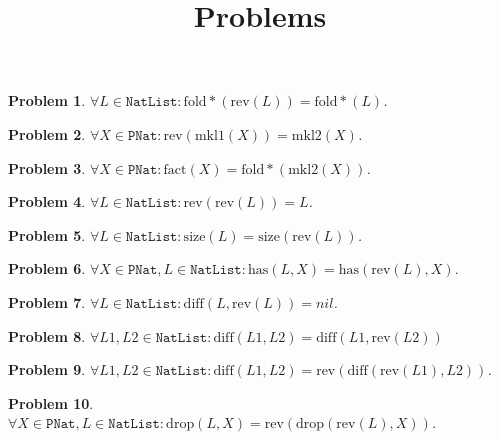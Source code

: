 \documentclass[12pt, a4paper]{article}
\title{Problems}
\date{\vspace{-5ex}}
\newtheorem{problem}{Problem}
\newcommand{\rmx}[1]{\mathrm{#1}}
\begin{document}
\maketitle

\begin{problem}
$\forall L \in \mathtt{NatList} \colon \rmx{fold*}(\rmx{rev}(L)) = \rmx{fold*}(L)$.
\end{problem}

\begin{problem}
$\forall X \in \mathtt{PNat} \colon \rmx{rev}(\rmx{mkl1}(X)) = \rmx{mkl2}(X)$.
\end{problem}

\begin{problem}
$\forall X \in \mathtt{PNat} \colon \rmx{fact}(X) = \rmx{fold*}(\rmx{mkl2}(X))$.
\end{problem}

\begin{problem}
$\forall L \in \mathtt{NatList} \colon \rmx{rev}(\rmx{rev}(L)) = L$.
\end{problem}

\begin{problem}
$\forall L \in \mathtt{NatList} \colon \rmx{size}(L) = \rmx{size}(\rmx{rev}(L))$.
\end{problem}

\begin{problem}
$\forall X \in \mathtt{PNat}, L \in \mathtt{NatList} \colon \rmx{has}(L, X) = \rmx{has}(\rmx{rev}(L), X)$.
\end{problem}

\begin{problem}
$\forall L \in \mathtt{NatList} \colon \rmx{diff}(L, \rmx{rev}(L)) = nil$.
\end{problem}

\begin{problem}
$\forall L1, L2 \in \mathtt{NatList} \colon \rmx{diff}(L1, L2) = \rmx{diff}(L1, \rmx{rev}(L2))$
\end{problem}

\begin{problem}
$\forall L1, L2 \in \mathtt{NatList} \colon \rmx{diff}(L1, L2) = \rmx{rev}(\rmx{diff}(\rmx{rev}(L1), L2))$.
\end{problem}

\begin{problem}
$\forall X \in \mathtt{PNat}, L \in \mathtt{NatList} \colon \rmx{drop}(L, X) = \rmx{rev}(\rmx{drop}(\rmx{rev}(L), X))$.
\end{problem}
\end{document}
